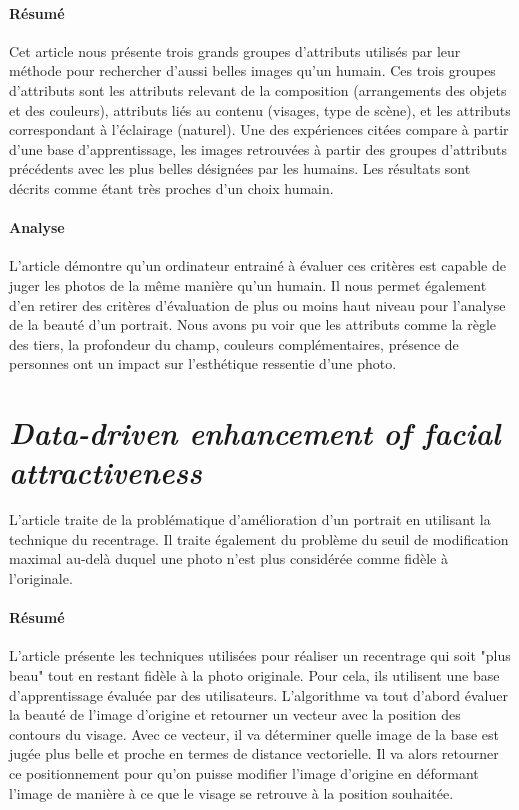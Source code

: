 \documentclass[11pt, french]{report-rd-info}
\begin{document}
\paragraph{Résumé}
Cet article nous présente trois grands groupes d'attributs utilisés par leur méthode pour rechercher d'aussi belles images qu'un humain.
Ces trois groupes d'attributs sont les attributs relevant de la composition (arrangements des objets et des couleurs), attributs liés au contenu (visages, type de scène), et les attributs correspondant à l'éclairage (naturel).
Une des expériences citées compare à partir d'une base d'apprentissage, les images retrouvées à partir des groupes d'attributs précédents avec les plus belles désignées par les humains. Les résultats sont décrits comme étant très proches d'un choix humain.

\paragraph{Analyse}
L'article démontre qu'un ordinateur entrainé à évaluer ces critères est capable de juger les photos de la même manière qu'un humain.
Il nous permet également d'en retirer des critères d'évaluation de plus ou moins haut niveau pour l'analyse de la beauté d'un portrait.
Nous avons pu voir que les attributs comme la règle des tiers, la profondeur du champ, couleurs complémentaires, présence de personnes ont un impact sur l'esthétique ressentie d'une photo.


\section{\emph{Data-driven enhancement of facial attractiveness}}
L'article \cite{Leyvand2008} traite de la problématique d'amélioration d'un portrait en utilisant la technique du recentrage. Il traite également du problème du seuil de modification maximal au-delà duquel une photo n'est plus considérée comme fidèle à l'originale.

\paragraph{Résumé}
L'article présente les techniques utilisées pour réaliser un recentrage qui soit "plus beau" tout en restant fidèle à la photo originale. Pour cela, ils utilisent une base d'apprentissage évaluée par des utilisateurs.
L'algorithme va tout d'abord évaluer la beauté de l'image d'origine et retourner un vecteur avec la position des contours du visage. Avec ce vecteur, il va déterminer quelle image de la base est jugée plus belle et proche en termes de distance vectorielle. Il va alors retourner ce positionnement pour qu'on puisse modifier l'image d'origine en déformant l'image de manière à ce que le visage se retrouve à la position souhaitée.
\end{document}
